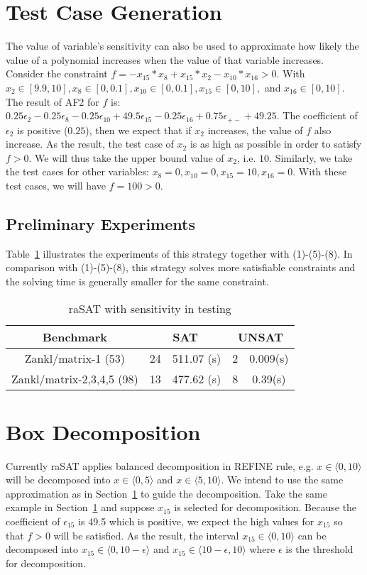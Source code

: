 \section{Test Case Generation} \label{sec:testGen}
\sloppy
The value of variable's sensitivity can also be used to approximate how likely the value of a polynomial increases when the value of that variable increases. Consider the constraint $f = -x_{15}*x_8+x_{15}*x_2-x_{10}*x_{16}>0$. With ${x_2 \in [9.9, 10]}, {x_8 \in [0, 0.1]}, {x_{10} \in [0, 0.1]}, {x_{15} \in [0, 10]},$ and $ x_{16} \in [0, 10]$. The result of AF2 for $f$ is: $0.25 \epsilon_2 - 0.25 \epsilon_8 - 0.25 \epsilon_{10} + 49.5\epsilon_{15} - 0.25\epsilon_{16} + 0.75\epsilon_{+-} + 49.25$. The coefficient of $\epsilon_2$ is positive ($0.25$), then we expect that if $x_2$ increases, the value of $f$ also increase.  As the result, the test case of $x_2$ is as high as possible in order to satisfy $f>0$. We will thus take the upper bound value of $x_2$, i.e. $10$. Similarly, we take the test cases for other variables: $x_8=0, x_{10}=0, x_{15}=10, x_{16}=0$. With these test cases, we will have $f=100 > 0$.
\subsection*{Preliminary Experiments}
Table~\ref{tab:senInTest} illustrates the experiments of this strategy together with (1)-(5)-(8). In comparison with (1)-(5)-(8), this strategy solves more satisfiable constraints and the solving time is generally smaller for the same constraint.
\begin{table} \label{tab:senInTest}
\begin{center}
\begin{tabular}{| c | c | c | c | c |}
\hline
Benchmark & \multicolumn{2}{|c|}{SAT} & \multicolumn{2}{c|}{UNSAT}\\ \hline
Zankl/matrix-1 (53) & 24 & 511.07 (s) & 2 & 0.009(s) \\ \hline
Zankl/matrix-2,3,4,5 (98) & 13 & 477.62 (s) & 8 & 0.39(s) \\ \hline
\end{tabular}
\end{center}
\caption{raSAT with sensitivity in testing}
\end{table}
\section{Box Decomposition}
Currently raSAT applies balanced decomposition in \tiny REFINE \normalsize rule, e.g. ${x \in \langle 0, 10 \rangle}$ will be decomposed into ${x \in \langle 0, 5 \rangle}$ and ${x \in \langle 5, 10 \rangle}$. We intend to use the same approximation as in Section~\ref{sec:testGen} to guide the decomposition. Take the same example in Section~\ref{sec:testGen} and suppose $x_{15}$ is selected for decomposition. Because the coefficient of $\epsilon_{15}$ is 49.5 which is positive, we expect the high values for $x_{15}$ so that $f > 0$ will be satisfied. As the result, the interval ${x_{15} \in \langle 0, 10 \rangle}$ can be decomposed into ${x_{15} \in \langle 0, 10 - \epsilon \rangle}$ and ${x_{15} \in \langle 10 - \epsilon, 10 \rangle}$ where $\epsilon$ is the threshold for decomposition.

